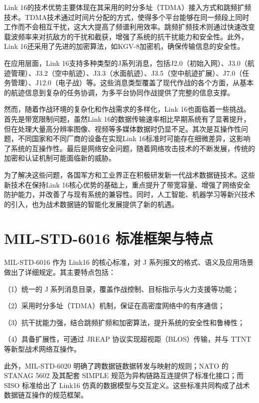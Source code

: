 Link 16的技术优势主要体现在其采用的时分多址（TDMA）接入方式和跳频扩频技术。TDMA技术通过时间片分配的方式，使得多个平台能够在同一频段上同时工作而不会相互干扰，这大大提高了频谱利用效率。跳频扩频技术则通过快速改变载波频率来对抗敌方的干扰和截获，增强了系统的抗干扰能力和安全性。此外，Link 16还采用了先进的加密算法，如KGV-8加密机，确保传输信息的安全性。

在应用层面，Link 16支持多种类型的J系列消息，包括J2.0（初始入网）、J3.0（航迹管理）、J3.2（空中航迹）、J3.3（水面航迹）、J3.5（空中航迹扩展）、J7.0（任务管理）、J12.0（电子战）等。这些消息类型覆盖了现代作战的各个方面，从基本的航迹信息到复杂的任务协调，为多平台协同作战提供了完整的信息支撑。

然而，随着作战环境的复杂化和作战需求的多样化，Link 16也面临着一些挑战。首先是带宽限制问题，虽然Link 16的数据传输速率相比早期系统有了显著提升，但在处理大量高分辨率图像、视频等多媒体数据时仍显不足。其次是互操作性问题，不同国家和不同厂商的设备在实现Link 16标准时可能存在细微差异，这影响了系统的互操作性。最后是网络安全问题，随着网络攻击技术的不断发展，传统的加密和认证机制可能面临新的威胁。

为了解决这些问题，各国军方和工业界正在积极研发新一代战术数据链技术。这些新技术在保持Link 16核心优势的基础上，重点提升了带宽容量、增强了网络安全防护能力，并改善了与现有系统的兼容性。同时，人工智能、机器学习等新兴技术的引入，也为战术数据链的智能化发展提供了新的机遇。

\section{MIL-STD-6016 标准框架与特点}
MIL-STD-6016 作为 {Link16} 的核心标准，对 J 系列报文的格式、语义及应用场景做出了详细规定\cite{ASSIST_6016_2024,CJCSM_6235_01_2025}。其主要特点包括：  

（1）统一的 J 系列消息目录，覆盖作战控制、目标指示与火力支援等功能；  

（2）采用时分多址（TDMA）机制，保证在高密度网络中的有序通信；  

（3）抗干扰能力强，结合跳频扩频和加密算法，提升系统的安全性和鲁棒性；  

（4）具备扩展性，可通过 {JREAP} 协议实现超视距（BLOS）传输，并与 {TTNT} 等新型战术网络互操作。

此外，MIL-STD-6020 明确了跨数据链数据转发与映射的规则；NATO 的 STANAG 5602 及其配套 SIMPLE 规范为异构链路互连提供了标准化接口；而 SISO 标准给出了 {Link16} 仿真的数据模型与交互定义\cite{Ultra_MDLMS_2021}。这些标准共同构成了战术数据链互操作的规范框架。

